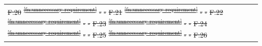 \documentclass[a4paper,12pt,twoside]{article}
\providecommand{\DIFdeltex}[1]{{\protect\color{red}\sout{#1}}}                      %
\providecommand{\DIFdel}[1]{\texorpdfstring{\DIFdeltex{#1}}{}} %
\begin{document}
\begin{longtable}[]{|m{}| m{} |m{} |m{}|m{}|}
\DIFdel{F.20 }%
\DIFdel{\textsuperscript{\ref{fn:unnecessary-requirement}} }%
\DIFdel{- }%
\DIFdel{- }%
\DIFdel{F.21 }%
\DIFdel{\textsuperscript{\ref{fn:unnecessary-requirement}}}%
\DIFdel{-}%
\DIFdel{-}%
\DIFdel{F.22 }%
\DIFdel{\textsuperscript{\ref{fn:unnecessary-requirement}}                                                                                              }%
\DIFdel{-        }%
\DIFdel{-            }%
\DIFdel{F.23 }%
\DIFdel{\textsuperscript{\ref{fn:unnecessary-requirement}}                                                                                             }%
\DIFdel{-       }%
\DIFdel{-            }%
\DIFdel{F.24 }%
\DIFdel{\textsuperscript{\ref{fn:unnecessary-requirement}}                                                                                          }%
\DIFdel{-        }%
\DIFdel{-            }%
\DIFdel{F.25 }%
\DIFdel{\textsuperscript{\ref{fn:unnecessary-requirement}}                                                                                         }%
\DIFdel{-        }%
\DIFdel{-            }%
\DIFdel{F.26 }%

\end{longtable}
\end{document}
